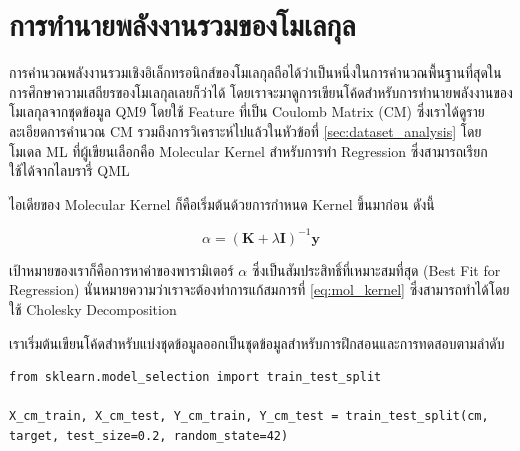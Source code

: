 
\section{การทำนายพลังงานรวมของโมเลกุล}
\label{sec:pred_tot_ener}

การคำนวณพลังงานรวมเชิงอิเล็กทรอนิกส์ของโมเลกุลถือได้ว่าเป็นหนึ่งในการคำนวณพื้นฐานที่สุดในการศึกษาความเสถียรของโมเลกุลเลยก็ว่าได้
โดยเราจะมาดูการเขียนโค้ดสำหรับการทำนายพลังงานของโมเลกุลจากชุดข้อมูล QM9 โดยใช้ Feature ที่เป็น Coulomb Matrix (CM) 
ซึ่งเราได้ดูรายละเอียดการคำนวณ CM รวมถึงการวิเคราะห์ไปแล้วในหัวข้อที่ \ref{sec:dataset_analysis} โดยโมเดล ML ที่ผู้เขียนเลือกคือ
Molecular Kernel สำหรับการทำ Regression ซึ่งสามารถเรียกใช้ได้จากไลบรารี่ QML

ไอเดียของ Molecular Kernel ก็คือเริ่มต้นด้วยการกำหนด Kernel ขึ้นมาก่อน ดังนี้

\begin{equation}\label{eq:mol_kernel}
    \alpha = (\mathbf{K} + \lambda\mathbf{I} ) ^{-1} \mathbf{y}
\end{equation}

\noindent เป้าหมายของเราก็คือการหาค่าของพารามิเตอร์ $\alpha$ ซึ่งเป็นสัมประสิทธิ์ที่เหมาะสมที่สุด (Best Fit for Regression) 
นั่นหมายความว่าเราจะต้องทำการแก้สมการที่ \ref{eq:mol_kernel} ซึ่งสามารถทำได้โดยใช้ Cholesky Decomposition

เราเริ่มต้นเขียนโค้ดสำหรับแบ่งชุดข้อมูลออกเป็นชุดข้อมูลสำหรับการฝึกสอนและการทดสอบตามลำดับ
\begin{lstlisting}[style=MyPython]
from sklearn.model_selection import train_test_split

X_cm_train, X_cm_test, Y_cm_train, Y_cm_test = train_test_split(cm, target, test_size=0.2, random_state=42)
\end{lstlisting}

